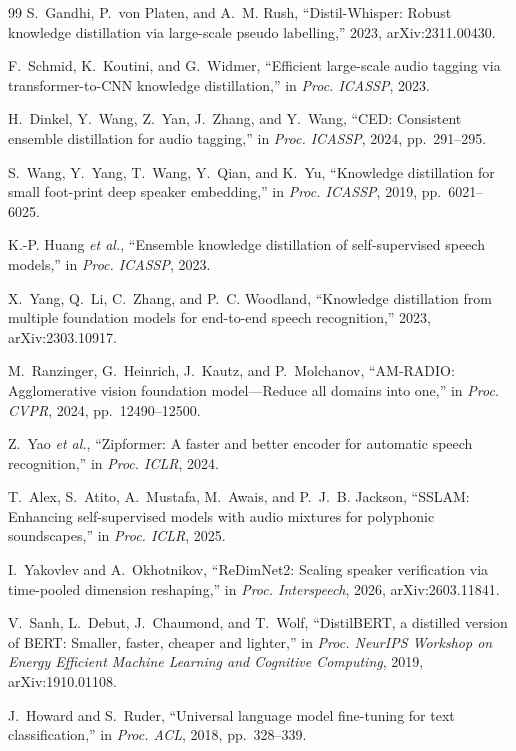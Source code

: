 \documentclass[lettersize,journal]{IEEEtran}
\begin{document}
\begin{thebibliography}{99}
S.~Gandhi, P.~von Platen, and A.~M. Rush, ``Distil-Whisper: Robust knowledge distillation via large-scale pseudo labelling,'' 2023, arXiv:2311.00430.

F.~Schmid, K.~Koutini, and G.~Widmer, ``Efficient large-scale audio tagging via transformer-to-CNN knowledge distillation,'' in \emph{Proc. ICASSP}, 2023.

H.~Dinkel, Y.~Wang, Z.~Yan, J.~Zhang, and Y.~Wang, ``CED: Consistent ensemble distillation for audio tagging,'' in \emph{Proc. ICASSP}, 2024, pp.~291--295.

S.~Wang, Y.~Yang, T.~Wang, Y.~Qian, and K.~Yu, ``Knowledge distillation for small foot-print deep speaker embedding,'' in \emph{Proc. ICASSP}, 2019, pp.~6021--6025.

K.-P. Huang \emph{et al.}, ``Ensemble knowledge distillation of self-supervised speech models,'' in \emph{Proc. ICASSP}, 2023.

X.~Yang, Q.~Li, C.~Zhang, and P.~C. Woodland, ``Knowledge distillation from multiple foundation models for end-to-end speech recognition,'' 2023, arXiv:2303.10917.

M.~Ranzinger, G.~Heinrich, J.~Kautz, and P.~Molchanov, ``AM-RADIO: Agglomerative vision foundation model---Reduce all domains into one,'' in \emph{Proc. CVPR}, 2024, pp.~12490--12500.

Z.~Yao \emph{et al.}, ``Zipformer: A faster and better encoder for automatic speech recognition,'' in \emph{Proc. ICLR}, 2024.

T.~Alex, S.~Atito, A.~Mustafa, M.~Awais, and P.~J.~B. Jackson, ``SSLAM: Enhancing self-supervised models with audio mixtures for polyphonic soundscapes,'' in \emph{Proc. ICLR}, 2025.

I.~Yakovlev and A.~Okhotnikov, ``ReDimNet2: Scaling speaker verification via time-pooled dimension reshaping,'' in \emph{Proc. Interspeech}, 2026, arXiv:2603.11841.

V.~Sanh, L.~Debut, J.~Chaumond, and T.~Wolf, ``DistilBERT, a distilled version of BERT: Smaller, faster, cheaper and lighter,'' in \emph{Proc. NeurIPS Workshop on Energy Efficient Machine Learning and Cognitive Computing}, 2019, arXiv:1910.01108.

J.~Howard and S.~Ruder, ``Universal language model fine-tuning for text classification,'' in \emph{Proc. ACL}, 2018, pp.~328--339.


\end{thebibliography}
\end{document}
